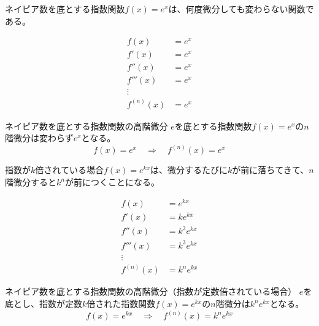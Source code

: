 \documentclass[../../imaging-math]{subfiles}
\begin{document}
ネイピア数を底とする指数関数$f(x)=e^x$は、何度微分しても変わらない関数である。

\begin{align}
  f(x)       & = e^x \\
  f'(x)      & = e^x \\
  f''(x)     & = e^x \\
  f'''(x)    & = e^x \\
  \vdots     &       \\
  f^{(n)}(x) & = e^x
\end{align}

\begin{theorem}{ネイピア数を底とする指数関数の高階微分}
  \titlegap
  $e$を底とする指数関数$f(x) = e^x$の$n$階微分は変わらず$e^x$となる。
  \LARGE
  \begin{equation}
    f(x) = e^{x} \quad \Longrightarrow \quad f^{(n)}(x) = e^{x}
  \end{equation}
\end{theorem}

指数が$k$倍されている場合$f(x)=e^{kx}$は、微分するたびに$k$が前に落ちてきて、$n$階微分すると$k^n$が前につくことになる。

\begin{align}
  f(x)       & = e^{kx}     \\
  f'(x)      & = ke^{kx}    \\
  f''(x)     & = k^2 e^{kx} \\
  f'''(x)    & = k^3 e^{kx} \\
  \vdots     &              \\
  f^{(n)}(x) & = k^ne^{kx}
\end{align}

\begin{theorem}{ネイピア数を底とする指数関数の高階微分（指数が定数倍されている場合）}
  \titlegap
  $e$を底とし、指数が定数$k$倍された指数関数$f(x) = e^{kx}$の$n$階微分は$k^n e^{kx}$となる。
  \LARGE
  \begin{equation}
    f(x) = e^{kx} \quad \Longrightarrow \quad f^{(n)}(x) = k^n e^{kx}
  \end{equation}
\end{theorem}
\end{document}
